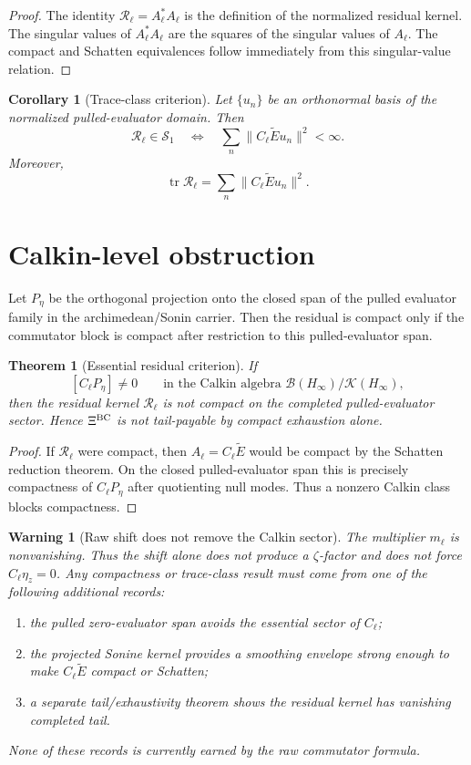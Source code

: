 \documentclass[11pt]{article}
\newtheorem{theorem}{Theorem}
\newtheorem{corollary}{Corollary}
\newtheorem{warning}{Warning}
\begin{document}
\begin{proof}
The identity $\mathcal R_\ell=A_\ell^*A_\ell$ is the definition of the normalized residual kernel.  The singular values of $A_\ell^*A_\ell$ are the squares of the singular values of $A_\ell$.  The compact and Schatten equivalences follow immediately from this singular-value relation.
\end{proof}

\begin{corollary}[Trace-class criterion]
Let $\{u_n\}$ be an orthonormal basis of the normalized pulled-evaluator domain.  Then
\[
        \mathcal R_\ell\in\mathcal S_1
        \quad\Longleftrightarrow\quad
        \sum_n\|C_\ell\widetilde E u_n\|^2<\infty.
\]
Moreover,
\[
        \operatorname{tr}\mathcal R_\ell
        =\sum_n\|C_\ell\widetilde E u_n\|^2.
\]
\end{corollary}

\section{Calkin-level obstruction}
Let $P_\eta$ be the orthogonal projection onto the closed span of the pulled evaluator family in the archimedean/Sonin carrier.  Then the residual is compact only if the commutator block is compact after restriction to this pulled-evaluator span.

\begin{theorem}[Essential residual criterion]
If
\[
        [C_\ell P_\eta]\ne 0
        \qquad\text{in the Calkin algebra }\mathcal B(H_\infty)/\mathcal K(H_\infty),
\]
then the residual kernel $\mathcal R_\ell$ is not compact on the completed pulled-evaluator sector.  Hence $\Xi^{\rm BC}$ is not tail-payable by compact exhaustion alone.
\end{theorem}

\begin{proof}
If $\mathcal R_\ell$ were compact, then $A_\ell=C_\ell\widetilde E$ would be compact by the Schatten reduction theorem.  On the closed pulled-evaluator span this is precisely compactness of $C_\ell P_\eta$ after quotienting null modes.  Thus a nonzero Calkin class blocks compactness.
\end{proof}

\begin{warning}[Raw shift does not remove the Calkin sector]
The multiplier $m_\ell$ is nonvanishing.  Thus the shift alone does not produce a $\zeta$-factor and does not force $C_\ell\eta_z=0$.  Any compactness or trace-class result must come from one of the following additional records:
\begin{enumerate}[label=(\alph*)]
\item the pulled zero-evaluator span avoids the essential sector of $C_\ell$;
\item the projected Sonine kernel provides a smoothing envelope strong enough to make $C_\ell\widetilde E$ compact or Schatten;
\item a separate tail/exhaustivity theorem shows the residual kernel has vanishing completed tail.
\end{enumerate}
None of these records is currently earned by the raw commutator formula.
\end{warning}
\end{document}
